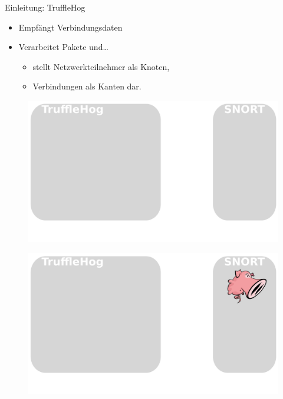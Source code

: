 \documentclass[18pt]{beamer}
\begin{document}
\begin{frame}{Einleitung: TruffleHog}
    \begin{itemize}
      \item Empfängt Verbindungsdaten
      \pause
      \item Verarbeitet Pakete und\dots
      \pause
      \begin{itemize}
        \item stellt Netzwerkteilnehmer als Knoten, \pause
        \item Verbindungen als Kanten dar.
      \end{itemize}
    \end{itemize}
\end{frame}


\begin{frame}
    \begin{figure}
    	\centering
    	\includegraphics[width=\textwidth]{./images/jan_1.png}
    \end{figure}
\end{frame}

\begin{frame}
    \begin{figure}
    	\centering
    	\includegraphics[width=\textwidth]{./images/jan_2.png}
    \end{figure}
\end{frame}
\end{document}
